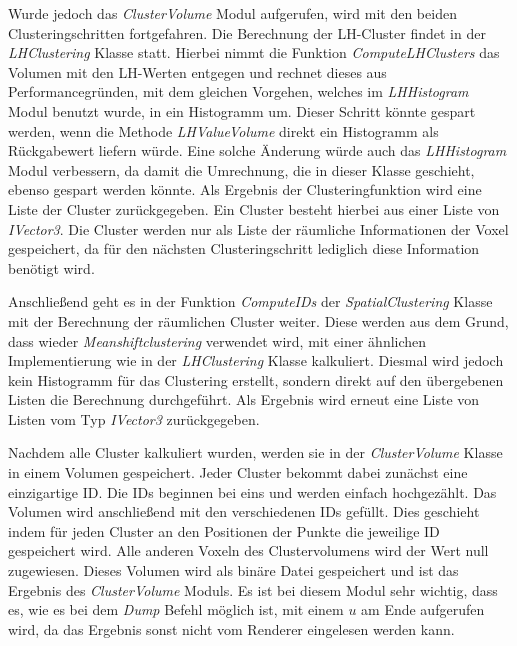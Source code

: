 Wurde jedoch das \textit{ClusterVolume} Modul aufgerufen, wird mit den beiden Clusteringschritten fortgefahren.
\newline
Die Berechnung der LH-Cluster findet in der \textit{LHClustering} Klasse statt. Hierbei nimmt die Funktion \textit{ComputeLHClusters} das Volumen mit den LH-Werten entgegen und rechnet dieses aus Performancegründen, mit dem gleichen Vorgehen, welches im \textit{LHHistogram} Modul benutzt wurde, in ein Histogramm um.
\newline
Dieser Schritt könnte gespart werden, wenn die Methode \textit{LHValueVolume} direkt ein Histogramm als Rückgabewert liefern würde. Eine solche Änderung würde auch das \textit{LHHistogram} Modul verbessern, da damit die Umrechnung, die in dieser Klasse geschieht, ebenso gespart werden könnte.
\newline
Als Ergebnis der Clusteringfunktion wird eine Liste der Cluster zurückgegeben. Ein Cluster besteht hierbei aus einer Liste von \textit{IVector3}. Die Cluster werden nur als Liste der räumliche Informationen der Voxel gespeichert, da für den nächsten Clusteringschritt  lediglich diese Information benötigt wird. 


Anschließend geht es in der Funktion \textit{ComputeIDs} der \textit{SpatialClustering} Klasse mit der Berechnung der räumlichen Cluster weiter. Diese werden aus dem Grund, dass wieder \textit{Meanshiftclustering} verwendet wird, mit einer ähnlichen Implementierung wie in der \textit{LHClustering} Klasse kalkuliert. Diesmal wird jedoch kein Histogramm für das Clustering erstellt, sondern direkt auf den übergebenen Listen die Berechnung durchgeführt.
\newline
Als Ergebnis wird erneut eine Liste von Listen vom Typ \textit{IVector3} zurückgegeben.


Nachdem alle Cluster kalkuliert wurden, werden sie in der \textit{ClusterVolume} Klasse in einem Volumen gespeichert. Jeder Cluster bekommt dabei zunächst eine einzigartige ID. Die IDs beginnen bei eins und werden einfach hochgezählt. Das Volumen wird anschließend mit den verschiedenen IDs gefüllt. Dies geschieht indem für jeden Cluster an den Positionen der Punkte die jeweilige ID gespeichert wird. Alle anderen Voxeln des Clustervolumens wird der Wert null zugewiesen.
\newline
Dieses Volumen wird als binäre Datei gespeichert und ist das Ergebnis des \textit{ClusterVolume} Moduls. Es ist bei diesem Modul sehr wichtig, dass es, wie es bei dem \textit{Dump} Befehl möglich ist, mit einem $u$ am Ende aufgerufen wird, da das Ergebnis sonst nicht vom Renderer eingelesen werden kann.


